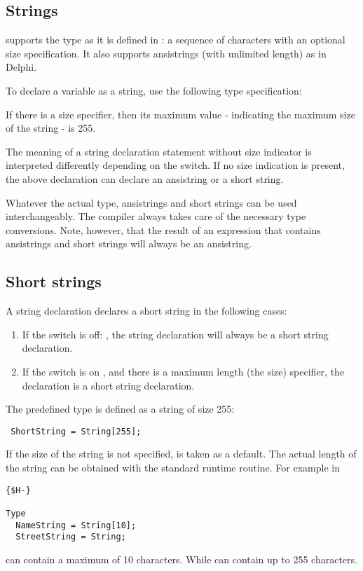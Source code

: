 \subsection{Strings}
 
\fpc supports the  type as it is defined in \tp:
a sequence of characters with an optional size specification.
It also supports ansistrings (with unlimited length) as in Delphi.

To declare a variable as a string, use the following type specification:

If there is a size specifier, then its maximum value - indicating the maximum 
size of the string - is 255.

The meaning of a string declaration statement without size indicator is 
interpreted differently depending on the  switch. If no size
indication is present, the above declaration can declare an ansistring or 
a short string.

Whatever the actual type, ansistrings and short strings can be used
interchangeably. The compiler always takes care of the necessary type
conversions. Note, however, that the result of an expression that contains
ansistrings and short strings will always be an ansistring.

\subsection{Short strings}
 
A string declaration declares a short string in the following cases:
\begin{enumerate}
\item If the switch is off: , the string declaration
will always be a short string declaration.
\item If the switch is on , and there is a maximum length (the
size) specifier, the declaration is a short string declaration.
\end{enumerate}
The predefined type  is defined as a string of size 255:
\begin{verbatim}
 ShortString = String[255];
\end{verbatim}
If the size of the string is not specified,  is taken as a
default. The actual length of the string can be obtained with the
 standard runtime routine.
For example in
\begin{verbatim}
{$H-}

Type
  NameString = String[10];
  StreetString = String;
\end{verbatim}
 can contain a maximum of 10 characters. While
 can contain up to 255 characters.

